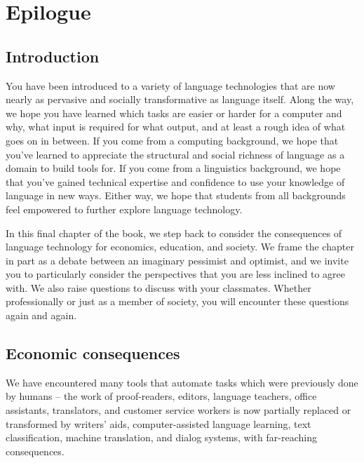 \chapter{Epilogue}
\label{ch:epilog}




\section{Introduction}

You have been introduced to a variety of language technologies  that are now nearly as pervasive and socially transformative as language itself.  Along the way, we hope you have learned which tasks are easier or harder for a computer and why, what input is required for what output, and at least a rough idea of what goes on in between.  If you come from a computing background, we hope that you've learned to appreciate  the structural and social richness of language as a domain to build tools for.  If you come from a linguistics background,  we hope that you've gained technical expertise and confidence to use your knowledge of language in new ways.  Either way, we hope that students from all backgrounds  feel empowered to further explore language technology.

In this final chapter of the book, we step back to consider the consequences of language technology for economics, education, and society.  We frame the chapter in part as a debate between an imaginary pessimist and optimist, and we invite you to particularly consider the perspectives that you are less inclined to agree with.  We also raise questions to discuss with your classmates.  Whether professionally or just as a member of society, you will encounter these questions again and again.  

\section{Economic consequences}

We have encountered many tools that automate tasks which were previously done by humans -- the work of  proof-readers, editors, language teachers, office assistants,  translators, and customer service workers is now partially replaced or transformed by writers' aids, computer-assisted language learning, text classification, machine translation, and dialog systems, with far-reaching  consequences.


